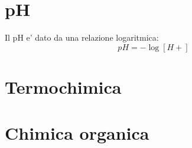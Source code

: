 \documentclass[12pt]{article}
\begin{document}
\section{pH}
Il pH e' dato da una relazione logaritmica:
$$
	pH = -\log[H+]
$$
\section{Termochimica}
\section{Chimica organica}
\end{document}
